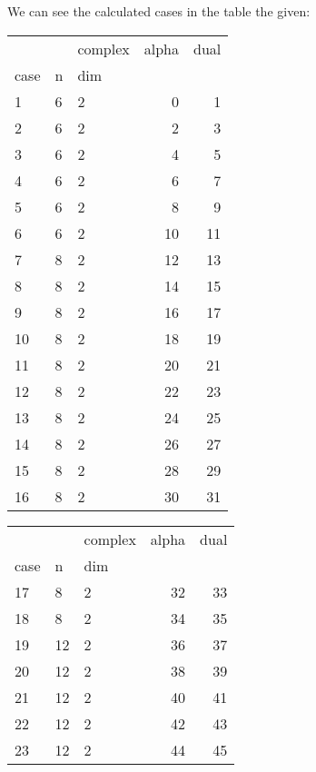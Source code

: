 \documentclass{article}
\begin{document}
\par We can see the calculated cases in the table the given:
\begin{center}
\begin{tabular}{lllrr}
\toprule
&  & complex & alpha & dual \\
case & n & dim &  &  \\
\midrule
1 & 6 & 2 & 0 & 1 \\
\cline{1-5} \cline{2-5}
2 & 6 & 2 & 2 & 3 \\
\cline{1-5} \cline{2-5}
3 & 6 & 2 & 4 & 5 \\
\cline{1-5} \cline{2-5}
4 & 6 & 2 & 6 & 7 \\
\cline{1-5} \cline{2-5}
5 & 6 & 2 & 8 & 9 \\
\cline{1-5} \cline{2-5}
6 & 6 & 2 & 10 & 11 \\
\cline{1-5} \cline{2-5}
7 & 8 & 2 & 12 & 13 \\
\cline{1-5} \cline{2-5}
8 & 8 & 2 & 14 & 15 \\
\cline{1-5} \cline{2-5}
9 & 8 & 2 & 16 & 17 \\
\cline{1-5} \cline{2-5}
10 & 8 & 2 & 18 & 19 \\
\cline{1-5} \cline{2-5}
11 & 8 & 2 & 20 & 21 \\
\cline{1-5} \cline{2-5}
12 & 8 & 2 & 22 & 23 \\
\cline{1-5} \cline{2-5}
13 & 8 & 2 & 24 & 25 \\
\cline{1-5} \cline{2-5}
14 & 8 & 2 & 26 & 27 \\
\cline{1-5} \cline{2-5}
15 & 8 & 2 & 28 & 29 \\
\cline{1-5} \cline{2-5}
16 & 8 & 2 & 30 & 31 \\
\cline{1-5} \cline{2-5}
\bottomrule
\end{tabular}
\begin{tabular}{lllrr}
\toprule
&  & complex & alpha & dual \\
case & n & dim &  &  \\
\midrule
17 & 8 & 2 & 32 & 33 \\
\cline{1-5} \cline{2-5}
18 & 8 & 2 & 34 & 35 \\
\cline{1-5} \cline{2-5}
19 & 12 & 2 & 36 & 37 \\
\cline{1-5} \cline{2-5}
20 & 12 & 2 & 38 & 39 \\
\cline{1-5} \cline{2-5}
21 & 12 & 2 & 40 & 41 \\
\cline{1-5} \cline{2-5}
22 & 12 & 2 & 42 & 43 \\
\cline{1-5} \cline{2-5}
23 & 12 & 2 & 44 & 45 \\

\end{tabular}
\end{center}
\end{document}

